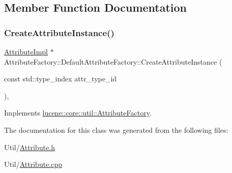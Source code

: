 \subsection{Member Function Documentation}
\mbox{\label{classlucene_1_1core_1_1util_1_1AttributeFactory_1_1DefaultAttributeFactory_af9b68def67fc7995d2c5e9f3d1560f5e}} 
\subsubsection{\texorpdfstring{Create\+Attribute\+Instance()}{CreateAttributeInstance()}}
{\footnotesize\ttfamily \mbox{\hyperlink{classlucene_1_1core_1_1util_1_1AttributeImpl}{Attribute\+Impl}} $\ast$ Attribute\+Factory\+::\+Default\+Attribute\+Factory\+::\+Create\+Attribute\+Instance (\begin{DoxyParamCaption}\item[{const std\+::type\+\_\+index}]{attr\+\_\+type\+\_\+id }\end{DoxyParamCaption})\hspace{0.3cm}{\ttfamily [override]}, {\ttfamily [virtual]}}



Implements \mbox{\hyperlink{classlucene_1_1core_1_1util_1_1AttributeFactory_a88ccb9965ed78099379eaf9b1256abf3}{lucene\+::core\+::util\+::\+Attribute\+Factory}}.



The documentation for this class was generated from the following files\+:\begin{DoxyCompactItemize}
\item 
Util/\mbox{\hyperlink{Util_2Attribute_8h}{Attribute.\+h}}\item 
Util/\mbox{\hyperlink{Util_2Attribute_8cpp}{Attribute.\+cpp}}\end{DoxyCompactItemize}
